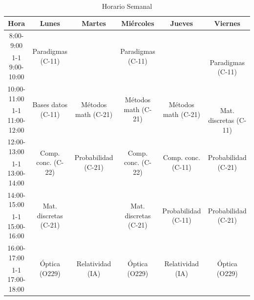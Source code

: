 \documentclass{article}
\begin{document}
\begin{table}[h]
\centering
\caption{Horario Semanal}
\label{tab:horario}
\begin{tabular}{|c|c|c|c|c|c|}
\hline
\textbf{Hora} & \textbf{Lunes} & \textbf{Martes} & \textbf{Miércoles} & \textbf{Jueves} & \textbf{Viernes} \\
\hline
8:00-9:00 & \multirow{2}{*}{Paradigmas (C-11)} & & \multirow{2}{*}{Paradigmas (C-11)} & & \multirow{3}{*}{Paradigmas (C-11)} \\
\cline{1-1}\cline{3-3}\cline{5-5}
9:00-10:00 & & & & & \\
\hline
10:00-11:00 & \multirow{2}{*}{Bases datos (C-11)} & \multirow{2}{*}{Métodos math (C-21)} & \multirow{2}{*}{Métodos math (C-21)} & \multirow{2}{*}{Métodos math (C-21)} & \\
\cline{1-1}\cline{6-6}
11:00-12:00 & & & & & Mat. discretas (C-11) \\
\hline
12:00-13:00 & \multirow{2}{*}{Comp. conc. (C-22)} & \multirow{2}{*}{Probabilidad (C-21)} & \multirow{2}{*}{Comp. conc. (C-22)} & \multirow{2}{*}{Comp. conc. (C-11)} & \multirow{2}{*}{Probabilidad (C-21)} \\
\cline{1-1}\cline{6-6}
13:00-14:00 & & & & & \\
\hline
14:00-15:00 & \multirow{2}{*}{Mat. discretas (C-21)} & & \multirow{2}{*}{Mat. discretas (C-21)} & \multirow{2}{*}{Probabilidad (C-11)} & \multirow{2}{*}{Probabilidad (C-21)} \\
\cline{1-1}\cline{3-3}\cline{6-6}
15:00-16:00 & & & & & \\
\hline
16:00-17:00 & \multirow{2}{*}{Óptica (O229)} & \multirow{2}{*}{Relatividad (IA)} & \multirow{2}{*}{Óptica (O229)} & \multirow{2}{*}{Relatividad (IA)} & \multirow{2}{*}{Óptica (O229)} \\
\cline{1-1}\cline{6-6}
17:00-18:00 & & & & & \\
\hline
\end{tabular}
\end{table}
\end{document}
